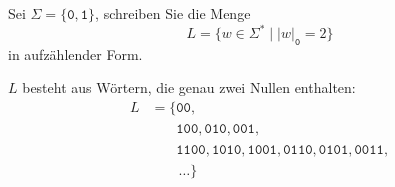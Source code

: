 Sei $\Sigma=\{\texttt{0},\texttt{1}\}$, schreiben Sie die Menge 
\[
L
=
\{w\in\Sigma^*\mid |w|_{\texttt{0}} = 2\}
\]
in aufzählender Form.


\begin{loesung}
$L$ besteht aus Wörtern, die genau zwei Nullen enthalten:
\begin{align*}
L
&=\{
\texttt{00},\\
&\phantom{=\{}
\texttt{100},
\texttt{010},
\texttt{001},\\
&\phantom{=\{}
\texttt{1100},
\texttt{1010},
\texttt{1001},
\texttt{0110},
\texttt{0101},
\texttt{0011},\\
&\qquad\dots\}
\end{align*}
\end{loesung}
